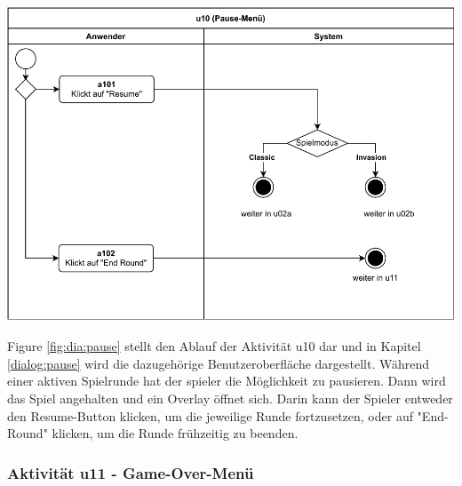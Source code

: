 \includegraphics[width=\linewidth]{diagramme/pdf/UML-Activity-u10.pdf}
\label{fig:dia:pause}
\vspace*{0.5cm}

Figure \ref{fig:dia:pause} stellt den Ablauf der Aktivität u10 dar und in Kapitel \ref{dialog:pause} wird die dazugehörige Benutzeroberfläche dargestellt.
Während einer aktiven Spielrunde hat der \gls{spieler} die Möglichkeit zu pausieren. Dann wird das Spiel angehalten und ein Overlay öffnet sich. Darin kann der Spieler entweder den Resume-Button klicken, um die jeweilige Runde fortzusetzen, oder auf "End-Round" klicken, um die Runde frühzeitig zu beenden.

\clearpage

\subsubsection{Aktivität u11 - Game-Over-Menü}\label{subsec:u11-gameOver}

\vspace*{1cm}

